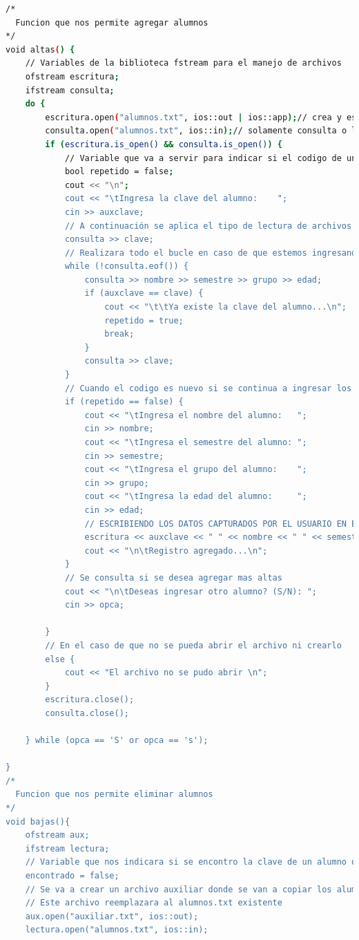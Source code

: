 \documentclass[12pt]{article}
\begin{document}
\begin{lstlisting}[language=bash,frame=single,style=CStyle]
/*
  Funcion que nos permite agregar alumnos
*/
void altas() {
    // Variables de la biblioteca fstream para el manejo de archivos
    ofstream escritura;
    ifstream consulta;
    do {
        escritura.open("alumnos.txt", ios::out | ios::app);// crea y escribe, si ya tiene texto une al final del archivo
        consulta.open("alumnos.txt", ios::in);// solamente consulta o lee usando la variable sobre el archivo físico alumnos.txt
        if (escritura.is_open() && consulta.is_open()) {
            // Variable que va a servir para indicar si el codigo de un alumno ya existe o no
            bool repetido = false;
            cout << "\n";
            cout << "\tIngresa la clave del alumno:    ";
            cin >> auxclave;
            // A continuación se aplica el tipo de lectura de archivos secuencial
            consulta >> clave;
            // Realizara todo el bucle en caso de que estemos ingresando un codigo ya existente en otro alumno
            while (!consulta.eof()) {
                consulta >> nombre >> semestre >> grupo >> edad;
                if (auxclave == clave) {
                    cout << "\t\tYa existe la clave del alumno...\n";
                    repetido = true;
                    break;
                }
                consulta >> clave;
            }
            // Cuando el codigo es nuevo si se continua a ingresar los datos del nuevo alumno
            if (repetido == false) {
                cout << "\tIngresa el nombre del alumno:   ";
                cin >> nombre;
                cout << "\tIngresa el semestre del alumno: ";
                cin >> semestre;
                cout << "\tIngresa el grupo del alumno:    ";
                cin >> grupo;
                cout << "\tIngresa la edad del alumno:     ";
                cin >> edad;
                // ESCRIBIENDO LOS DATOS CAPTURADOS POR EL USUARIO EN EL ARCHIVO
                escritura << auxclave << " " << nombre << " " << semestre << " " << grupo << " " << edad << endl;
                cout << "\n\tRegistro agregado...\n";
            }
            // Se consulta si se desea agregar mas altas
            cout << "\n\tDeseas ingresar otro alumno? (S/N): ";
            cin >> opca;

        }
        // En el caso de que no se pueda abrir el archivo ni crearlo
        else {
            cout << "El archivo no se pudo abrir \n";
        }
        escritura.close();
        consulta.close();

    } while (opca == 'S' or opca == 's');

}
/*
  Funcion que nos permite eliminar alumnos
*/
void bajas(){
    ofstream aux;
    ifstream lectura;
    // Variable que nos indicara si se encontro la clave de un alumno o no
    encontrado = false;
    // Se va a crear un archivo auxiliar donde se van a copiar los alumnos mientras se vayan eliminando
    // Este archivo reemplazara al alumnos.txt existente
    aux.open("auxiliar.txt", ios::out);
    lectura.open("alumnos.txt", ios::in);


\end{lstlisting}
\end{document}

